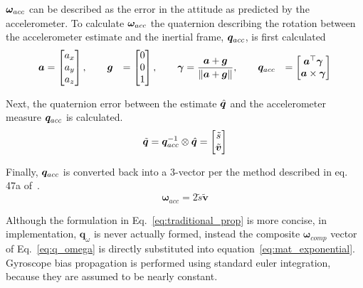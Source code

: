 \documentclass[paper=a4, fontsize=11pt]{scrartcl} %
\numberwithin{equation}{section} %
\numberwithin{figure}{section} %
\numberwithin{table}{section} %
\begin{document}
$\bm{\omega}_{acc}$ can be described as the error in the attitude as predicted by the accelerometer.  To calculate $\bm{\omega}_{acc}$ the quaternion describing the rotation between the accelerometer estimate and the inertial frame, $\bm{q}_{acc}$, is first calculated
\begin{equation}
\begin{aligned}
	\bm{a} &= 
		\begin{bmatrix}
			a_x \\
			a_y \\
			a_z \\
			\end{bmatrix},
	\qquad
	\bm{g} &=
	  \begin{bmatrix}
			0 \\
			0 \\
			1 \\
		\end{bmatrix}, \qquad
	\bm{\gamma} &= \frac{\bm{a}+\bm{g}}{\left\lVert\bm{a}+\bm{g}\right\rVert}, \qquad
	\bm{q}_{acc} &=
	  \begin{bmatrix}
	    \bm{a}^\top \bm{\gamma} \\
	    \bm{a} \times \bm{\gamma}
	  \end{bmatrix}
\end{aligned}
\end{equation}

\newcommand{\qtilde}{\tilde{\bm{q}}}
\newcommand{\vtilde}{\tilde{\bm{v}}}
Next, the quaternion error between the estimate $\hat{\bm{q}}$ and the accelerometer measure $\bm{q}_{acc}$ is calculated.
\begin{equation}
	\qtilde = \qmeas^{-1} \otimes \qhat = 
		\begin{bmatrix}
			\tilde{s}\\
			\vtilde
		\end{bmatrix}
\end{equation}

\newcommand{\wmeas}{\bm{\omega}_{acc}}
Finally, $\bm{q}_{acc}$ is converted back into a 3-vector per the method described in eq. 47a of~\cite{Mahony2007}.
\begin{equation}
	\wmeas = 2\tilde{s}\vtilde
\end{equation}

Although the formulation in Eq.~\ref{eq:traditional_prop} is more concise, in implementation, $\bm{q}_{\omega}$ is never actually formed, instead the composite $\bm{\omega}_{comp}$ vector of Eq.~\ref{eq:q_omega} is directly substituted into equation~\ref{eq:mat_exponential}.  Gyroscope bias propagation is performed using standard euler integration, because they are assumed to be nearly constant.
\end{document}
